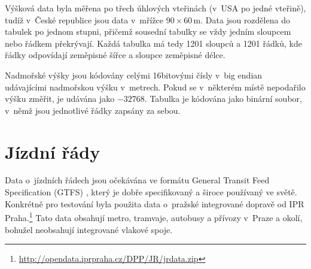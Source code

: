 Výšková data byla měřena po třech úhlových vteřinách (v~USA po jedné vteřině),
tudíž v~České republice jsou data v~mřížce $90\times60$\,m. Data jsou rozdělena
do tabulek po jednom stupni, přičemž sousední tabulky se vždy jedním sloupcem
nebo řádkem překrývají. Každá tabulka má tedy 1201 sloupců a 1201 řádků, kde
řádky odpovídají zeměpisné šířce a sloupce zeměpisné délce.

Nadmořské výšky jsou kódovány celými 16bitovými čísly v~big endian udávajícími
nadmořskou výšku v~metrech. Pokud se v~některém místě nepodařilo výšku změřit,
je udávána jako $-32768$. Tabulka je kódována jako binární soubor, v~němž jsou
jednotlivé řádky zapsány za sebou.

\section{Jízdní řády}
Data o~jízdních řádech jsou očekávána ve formátu General Transit Feed
Specification (GTFS) \cite{GTFS}, který je dobře specifikovaný a široce používaný ve světě.
Konkrétně pro testování byla použita data o~pražské integrované dopravě od IPR
Praha.\footnote{\url{http://opendata.iprpraha.cz/DPP/JR/jrdata.zip}} Tato data
obsahují metro, tramvaje, autobusy a přívozy v~Praze a okolí, bohužel neobsahují
integrované vlakové spoje.

